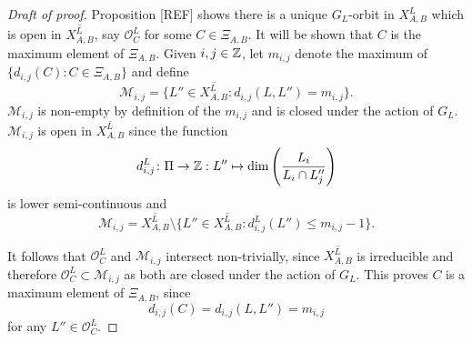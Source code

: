 \documentclass[a4paper, 11pt]{report}
\begin{document}
\begin{proof}[Draft of proof]
Proposition [REF] shows there is a unique $G_L$-orbit in $X_{A,B}^L$ which is open in $\overline{X_{A,B}^L}$, say $\mathcal{O}_C^L$ for some $C\in\Xi_{A,B}$. It will be shown that $C$ is the maximum element of $\Xi_{A,B}$. Given $i,j\in\mathbb{Z}$, let $m_{i,j}$ denote the maximum of $\{d_{i,j}(C): C\in\Xi_{A,B}\}$ and define
\begin{equation*}
\mathcal{M}_{i,j} = \{L''\in \overline{X_{A,B}^L}: d_{i,j}(L,L'') = m_{i,j}\}.
\end{equation*}
$\mathcal{M}_{i,j}$ is non-empty by definition of the $m_{i,j}$ and is closed under the action of $G_L$. $\mathcal{M}_{i,j}$ is open in $\overline{X_{A,B}^L}$ since the function
\begin{equation*}
d_{i,j}^L\colon\Pi\to\mathbb{Z}: L''\mapsto \dim\left(\frac{L_i}{L_i\cap L_j''}\right)
\end{equation*}
is lower semi-continuous and
\begin{equation*}
\mathcal{M}_{i,j} = \overline{X_{A,B}^L}\setminus \{L''\in\overline{X_{A,B}^L}: d_{i,j}^L(L'')\le m_{i,j} -1\}.
\end{equation*}

It follows that $\mathcal{O}_C^L$ and $\mathcal{M}_{i,j}$ intersect non-trivially, since $\overline{X_{A,B}^L}$ is irreducible and therefore $\mathcal{O}_C^L\subset \mathcal{M}_{i,j}$ as both are closed under the action of $G_L$. This proves $C$ is a maximum element of $\Xi_{A,B}$, since
\begin{equation*}
d_{i,j}(C) = d_{i,j}(L,L'') = m_{i,j}
\end{equation*}
for any $L''\in\mathcal{O}_C^L$.

\end{proof}
\end{document}
